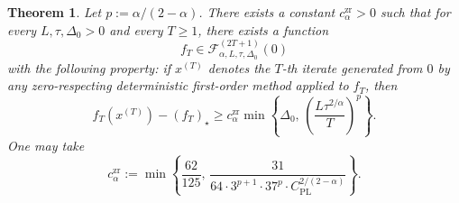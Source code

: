 \documentclass[11pt]{article}
\newtheorem{theorem}{Theorem}[section]
\begin{document}
\begin{theorem}
\label{thm:zr}
Let \(p:=\alpha/(2-\alpha)\). There exists a constant \(c_\alpha^{\mathrm{zr}}>0\) such that for every
\(L,\tau,\Delta_0>0\) and every \(T\ge 1\), there exists a function
\[
f_T\in \mathcal F^{(2T+1)}_{\alpha,L,\tau,\Delta_0}(0)
\]
with the following property: if \(x^{(T)}\) denotes the \(T\)-th iterate generated from \(0\) by any zero-respecting
deterministic first-order method applied to \(f_T\), then
\[
f_T(x^{(T)})-(f_T)_\star
\ge
c_\alpha^{\mathrm{zr}}
\min\!\left\{
\Delta_0,\,
\left(\frac{L\tau^{2/\alpha}}{T}\right)^p
\right\}.
\]
One may take
\[
c_\alpha^{\mathrm{zr}}
:=
\min\!\left\{
\frac{62}{125},\,
\frac{31}{64\cdot 3^{p+1}\cdot 37^p\cdot C_{\mathrm{PL}}^{2/(2-\alpha)}}
\right\}.
\]
\end{theorem}
\end{document}
